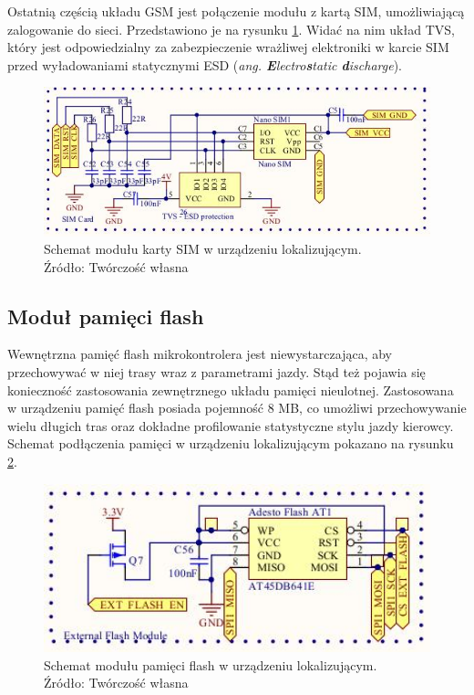 Ostatnią częścią układu GSM jest połączenie modułu z kartą SIM, umożliwiającą zalogowanie do sieci. Przedstawiono je na rysunku \ref{fig:image_mainboard_functional_gsm_sim_card}. Widać na nim układ TVS, który jest odpowiedzialny za zabezpieczenie wrażliwej elektroniki w karcie SIM przed wyładowaniami statycznymi ESD (\textit{ang. \textbf{E}lectro\textbf{s}tatic \textbf{d}ischarge}).

\begin{figure}[H]
	\centering
	\includegraphics[width=15cm]{img/schematics/mainboard_gsm_sim_card.jpg}
	\caption{Schemat modułu karty SIM w urządzeniu lokalizującym. \\ Źródło: Twórczość własna}
	\label{fig:image_mainboard_functional_gsm_sim_card}
\end{figure}

\subsection{Moduł pamięci flash}

Wewnętrzna pamięć flash mikrokontrolera jest niewystarczająca, aby przechowywać w niej trasy wraz z parametrami jazdy. Stąd też pojawia się konieczność zastosowania zewnętrznego układu pamięci nieulotnej. Zastosowana w urządzeniu pamięć flash posiada pojemność 8 MB, co umożliwi przechowywanie wielu długich tras oraz dokładne profilowanie statystyczne stylu jazdy kierowcy. Schemat podłączenia pamięci w urządzeniu lokalizującym pokazano na rysunku \ref{fig:image_mainboard_functional_flash}.

\begin{figure}[H]
	\centering
	\includegraphics[width=15cm]{img/schematics/mainboard_functional_flash_memory.jpg}
	\caption{Schemat modułu pamięci flash w urządzeniu lokalizującym. \\ Źródło: Twórczość własna}
	\label{fig:image_mainboard_functional_flash}
\end{figure}

